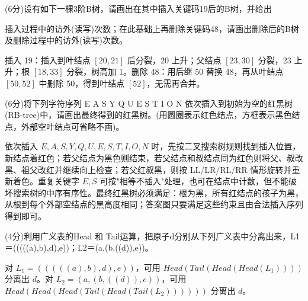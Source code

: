 \begin{question}
(6分)设有如下一棵3阶B树，请画出在其中插入关键码19后的B树，并给出

\begin{center}
\end{center}

插入过程中的访外(读写)次数；在此基础上再删除关键码48，请画出删除后的B树及删除过程中的访外(读写)次数。
\begin{solution}
插入 19：插入到叶结点 $[20,21]$ 后分裂，20 上升；父结点 $[23,30]$ 分裂，23 上升；根 $[18,33]$ 分裂，树高加 1。删除 48：用后继 50 替换 48，再从叶结点 $[50,52]$ 中删除 50，得到叶结点 $[52]$，无需再合并。
\end{solution}
\end{question}

\begin{question}
(6分)将下列字符序列 E A S Y Q U E S T I O N 依次插入到初始为空的红黑树(RB-tree)中，请画出最终得到的红黑树。(用圆圈表示红色结点，方框表示黑色结点，外部空叶结点可省略不画)。
\begin{solution}
依次插入 $E,A,S,Y,Q,U,E,S,T,I,O,N$ 时，先按二叉搜索树规则找到插入位置，新结点着红色；若父结点为黑色则结束，若父结点和叔结点同为红色则将父、叔改黑、祖父改红并继续向上检查；若父红叔黑，则按 LL/LR/RL/RR 情形旋转并重新着色。重复关键字 $E,S$ 可按"相等不插入"处理，也可在结点中计数，但不能破坏搜索树的中序有序性。最终红黑树必须满足：根为黑，所有红结点的孩子为黑，从根到每个外部空结点的黑高度相同；答案图只要满足这些约束且由合法插入序列得到即可。
\end{solution}
\end{question}

\begin{question}
(4分)利用广义表的Head 和 Tail运算，把原子d分别从下列广义表中分离出来，L1＝(((((a),b),d),e))；L2＝(a,(b,((d)),e))。
\begin{solution}
对 $L_1=(((((a),b),d),e))$，可用 $Head(Tail(Head(Head(L_1))))$ 分离出 $d$。对 $L_2=(a,(b,((d)),e))$，可用 $Head(Head(Head(Tail(Head(Tail(L_2))))))$ 分离出 $d$。
\end{solution}
\end{question}

